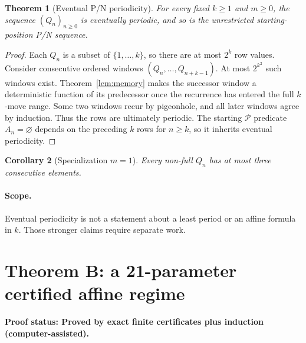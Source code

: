 \documentclass[11pt]{article}
\newtheorem{theorem}{Theorem}[section]
\newtheorem{corollary}[theorem]{Corollary}
\theoremstyle{remark}
\newcommand{\Pset}{\mathcal{P}}
\newcommand{\statusmachine}{\textbf{Proof status: Proved by exact finite certificates plus induction (computer-assisted).}}
\begin{document}
\begin{theorem}[Eventual P/N periodicity]\label{thm:Aperiod}
For every fixed $k\ge1$ and $m\ge0$, the sequence $(Q_n)_{n\ge0}$ is eventually periodic, and so is the unrestricted starting-position P/N sequence.
\end{theorem}
\begin{proof}
Each $Q_n$ is a subset of $\{1,\ldots,k\}$, so there are at most $2^k$ row values. Consider consecutive ordered windows $(Q_n,\ldots,Q_{n+k-1})$. At most $2^{k^2}$ such windows exist. Theorem~\ref{lem:memory} makes the successor window a deterministic function of its predecessor once the recurrence has entered the full $k$-move range. Some two windows recur by pigeonhole, and all later windows agree by induction. Thus the rows are ultimately periodic. The starting $\Pset$ predicate $A_n=\varnothing$ depends on the preceding $k$ rows for $n\ge k$, so it inherits eventual periodicity.
\end{proof}
\begin{corollary}[Specialization $m=1$] Every non-full $Q_n$ has at most three consecutive elements.\end{corollary}
\paragraph{Scope.} Eventual periodicity is not a statement about a least period or an affine formula in $k$. Those stronger claims require separate work.

\section{Theorem B: a 21-parameter certified affine regime}\label{sec:B}
\statusmachine
\end{document}
